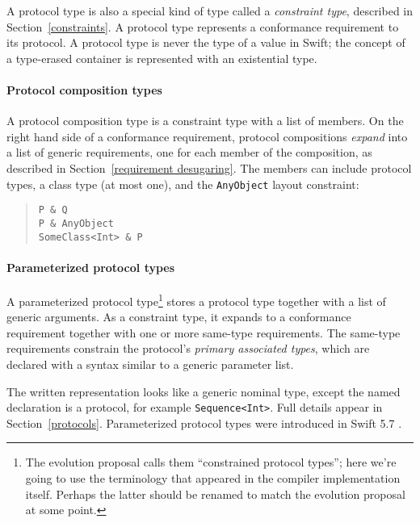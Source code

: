 \documentclass[a4paper,headsepline,bibliography=totoc,toc=flat,fleqn,twoside=semi]{scrbook}
\theoremstyle{definition}
\theoremstyle{definition}
\theoremstyle{definition}
\begin{document}
A protocol type is also a special kind of type called a \emph{constraint type}, described in Section~\ref{constraints}. A protocol type represents a conformance requirement to its protocol. A protocol type is never the type of a value in Swift; the concept of a type-erased container is represented with an existential type.

\paragraph{Protocol composition types}
A protocol composition type is a constraint type with a list of members. On the right hand side of a conformance requirement, protocol compositions \emph{expand} into a list of generic requirements, one for each member of the composition, as described in Section~\ref{requirement desugaring}. The members can include protocol types, a class type (at most one), and the \texttt{AnyObject} layout constraint:
\begin{quote}
\begin{verbatim}
P & Q
P & AnyObject
SomeClass<Int> & P
\end{verbatim}
\end{quote}

\paragraph{Parameterized protocol types}
A parameterized protocol type\footnote{The evolution proposal calls them ``constrained protocol types''; here we're going to use the terminology that appeared in the compiler implementation itself. Perhaps the latter should be renamed to match the evolution proposal at some point.} stores a protocol type together with a list of generic arguments. As a constraint type, it expands to a conformance requirement together with one or more same-type requirements. The same-type requirements constrain the protocol's \emph{primary associated types}, which are declared with a syntax similar to a generic parameter list.

The written representation looks like a generic nominal type, except the named declaration is a protocol, for example \texttt{Sequence<Int>}. Full details appear in Section~\ref{protocols}. Parameterized protocol types were introduced in Swift 5.7 \cite{se0346}.

\end{document}
